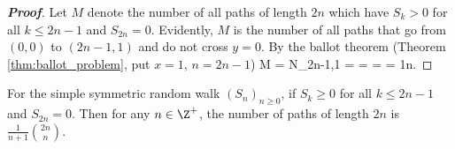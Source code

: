 \begin{proof}[\bf Proof]
Let $M$ denote the number of all paths of length $2n$ which have $S_k>0$ for all $k\leq 2n-1$ and $S_{2n}=0$. Evidently, $M$ is the number of all paths that go from $(0,0)$ to $(2n-1,1)$ and do not cross $y=0$. By the ballot theorem (Theorem \ref{thm:ballot_problem}, put $x=1$, $n=2n-1$)
\be
M = N_{2n-1,1} =  =  =  = \frac 1n.
\ee
\end{proof}

\begin{proposition}\label{pro:random_walk_number_paths_greater_equal_than_zero}
For the simple symmetric random walk $(S_n)_{n\geq 0}$, if $S_k \geq 0$ for all $k\leq 2n-1$ and $S_{2n} = 0$. Then for any $n\in \Z^+$, the number of paths of length $2n$ is $\frac 1{n+1}\binom{2n}{n}$.
\end{proposition}

